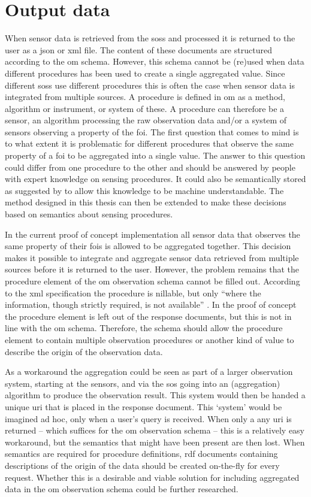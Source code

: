 \section{Output data}
When sensor data is retrieved from the \aclp{sos} and processed it is returned to the user as a \ac{json} or \ac{xml} file. The content of these documents are structured according to the \ac{om} schema. However, this schema cannot be (re)used when data different procedures has been used to create a single aggregated value. Since different \aclp{sos} use different procedures this is often the case when sensor data is integrated from multiple sources. A procedure is defined in \ac{om} as a method, algorithm or instrument, or system of these. A procedure can therefore be a sensor, an algorithm processing the raw observation data and/or a system of sensors observing a property of the \ac{foi}. The first question that comes to mind is to what extent it is problematic for different procedures that observe the same property of a \ac{foi} to be aggregated into a single value. The answer to this question could differ from one procedure to the other and should be answered by people with expert knowledge on sensing procedures. It could also be semantically stored as suggested by \cite{SSW:Stasch4} to allow this knowledge to be machine understandable. The method designed in this thesis can then be extended to make these decisions based on semantics about sensing procedures. 

In the current proof of concept implementation all sensor data that observes the same property of their \acp{foi} is allowed to  be aggregated together. This decision makes it possible to integrate and aggregate sensor data retrieved from multiple sources before it is returned to the user. However, the problem remains that the procedure element of the \ac{om} observation schema cannot be filled out. According to the \ac{xml} specification the procedure is nillable, but only \enquote{where the information, though strictly required, is not available} \citep[p. 42]{SW:OGC8}. In the proof of concept the procedure element is left out of the response documents, but this is not in line with the \ac{om} schema. Therefore, the schema should allow the procedure element to contain multiple observation procedures or another kind of value to describe the origin of the observation data. 

As a workaround the aggregation could be seen as part of a larger observation system, starting at the sensors, and via the \ac{sos} going into an (aggregation) algorithm to produce the observation result. This system would then be handed a unique \ac{uri} that is placed in the response document. This `system' would be imagined ad hoc, only when a user's query is received. When only a any \ac{uri} is returned -- which suffices for the \ac{om} observation schema -- this is a relatively easy workaround, but the semantics that might have been present are then lost. When semantics are required for procedure definitions, \ac{rdf} documents containing descriptions of the origin of the data should be created on-the-fly for every request. Whether this is a desirable and viable solution for including aggregated data in the \ac{om} observation schema could be further researched.        


